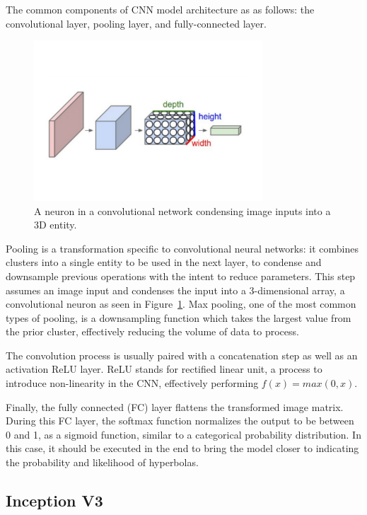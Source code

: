 \documentclass[se,blockletter]{uw-wkrpt}
\begin{document}
The common components of CNN model architecture as as follows: the convolutional layer, pooling layer, and fully-connected layer.

\begin{figure}
  \centering
  \includegraphics[height=6cm]{convolutional-neuron}
  \caption{A neuron in a convolutional network condensing image inputs into a 3D entity.~\cite{ref:}}
  \label{fig:cnn-neuron}
\end{figure}

Pooling is a transformation specific to convolutional neural networks: it combines clusters into a single entity to be used in the next layer, to condense and downsample previous operations with the intent to reduce parameters. This step assumes an image input and condenses the input into a 3-dimensional array, a convolutional neuron as seen in Figure~\ref{fig:cnn-neuron}. Max pooling, one of the most common types of pooling, is a downsampling function which takes the largest value from the prior cluster, effectively reducing the volume of data to process.  

The convolution process is usually paired with a concatenation step as well as an activation ReLU layer. ReLU stands for rectified linear unit, a process to introduce non-linearity in the CNN, effectively performing $f(x) = max(0, x)$.  

Finally, the fully connected (FC) layer flattens the transformed image matrix. During this FC layer, the softmax function normalizes the output to be between 0 and 1, as a sigmoid function, similar to a categorical probability distribution. In this case, it should be executed in the end to bring the model closer to indicating the probability and likelihood of hyperbolas. 

\subsection{Inception V3}
\end{document}
